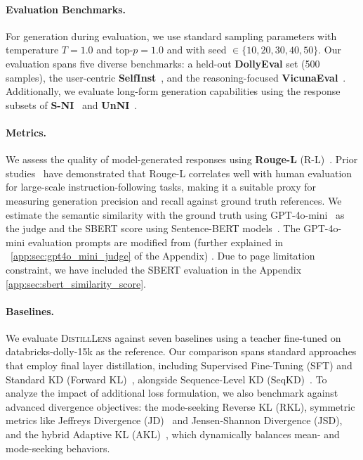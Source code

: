\documentclass{article}
\theoremstyle{plain}
\theoremstyle{definition}
\theoremstyle{remark}
\begin{document}
\paragraph{Evaluation Benchmarks.}
For generation during evaluation, we use standard sampling parameters with temperature $T=1.0$ and top-$p=1.0$ and with seed $\in \{10, 20, 30, 40, 50\}$. 
Our evaluation spans five diverse benchmarks: a held-out \textbf{DollyEval} set (500 samples), the user-centric \textbf{SelfInst}~\cite{wang2023self}, and the reasoning-focused \textbf{VicunaEval}~\cite{zheng2023judging}. Additionally, we evaluate long-form generation capabilities using the  response subsets of \textbf{S-NI}~\cite{wang2022super} and \textbf{UnNI}~\cite{honovich2023unnatural}.

\paragraph{Metrics.}
We assess the quality of model-generated responses using \textbf{Rouge-L} (R-L)~\cite{lin2004rouge}. 
Prior studies~\cite{wang2022super} have demonstrated that Rouge-L correlates well with human evaluation for large-scale instruction-following tasks, making it a suitable proxy for measuring generation precision and recall against ground truth references.
We estimate the semantic similarity with the ground truth using GPT-4o-mini~\cite{hurst2024gpt} as the judge and the SBERT score using Sentence-BERT models~\cite{reimers2019sentence}.
The GPT-4o-mini evaluation prompts are modified from \citep{zheng2023judging} (further explained in ~\cref{app:sec:gpt4o_mini_judge} of the Appendix) .
Due to page limitation constraint, we have included the SBERT evaluation in the Appendix \cref{app:sec:sbert_similarity_score}.

\paragraph{Baselines.}
We evaluate \textsc{DistillLens} against seven baselines using a teacher fine-tuned on databricks-dolly-15k as the reference. 
Our comparison spans standard approaches that employ final layer distillation, including Supervised Fine-Tuning (SFT) and Standard KD (Forward KL)~\cite{hinton2015distilling}, alongside Sequence-Level KD (SeqKD)~\cite{kim2016sequence}. 
To analyze the impact of additional loss formulation, we also benchmark against advanced divergence objectives: the mode-seeking Reverse KL (RKL), symmetric metrics like Jeffreys Divergence (JD)~\cite{jeffreys1948theory} and Jensen-Shannon Divergence (JSD), and the hybrid Adaptive KL (AKL)~\cite{wu2024rethinking}, which dynamically balances mean- and mode-seeking behaviors.
\end{document}
